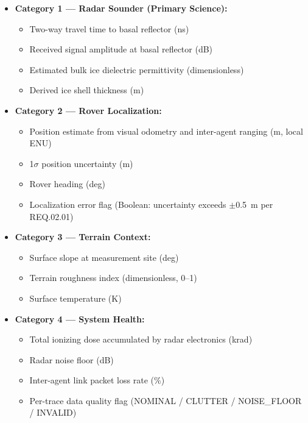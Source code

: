 \documentclass[11pt]{article}
\begin{document}
\begin{itemize}[leftmargin=1.5em]

    \item \textbf{Category 1 --- Radar Sounder (Primary Science):}
    \begin{itemize}
        \item Two-way travel time to basal reflector (ns)
        \item Received signal amplitude at basal reflector (dB)
        \item Estimated bulk ice dielectric permittivity (dimensionless)
        \item Derived ice shell thickness (m)
    \end{itemize}

    \item \textbf{Category 2 --- Rover Localization:}
    \begin{itemize}
        \item Position estimate from visual odometry and inter-agent ranging (m, local ENU)
        \item 1$\sigma$ position uncertainty (m)
        \item Rover heading (deg)
        \item Localization error flag (Boolean: uncertainty exceeds $\pm$0.5~m per REQ.02.01)
    \end{itemize}

    \item \textbf{Category 3 --- Terrain Context:}
    \begin{itemize}
        \item Surface slope at measurement site (deg)
        \item Terrain roughness index (dimensionless, 0--1)
        \item Surface temperature (K)
    \end{itemize}

    \item \textbf{Category 4 --- System Health:}
    \begin{itemize}
        \item Total ionizing dose accumulated by radar electronics (krad)
        \item Radar noise floor (dB)
        \item Inter-agent link packet loss rate (\%)
        \item Per-trace data quality flag (NOMINAL / CLUTTER / NOISE\_FLOOR / INVALID)
    \end{itemize}


\end{itemize}
\end{document}
